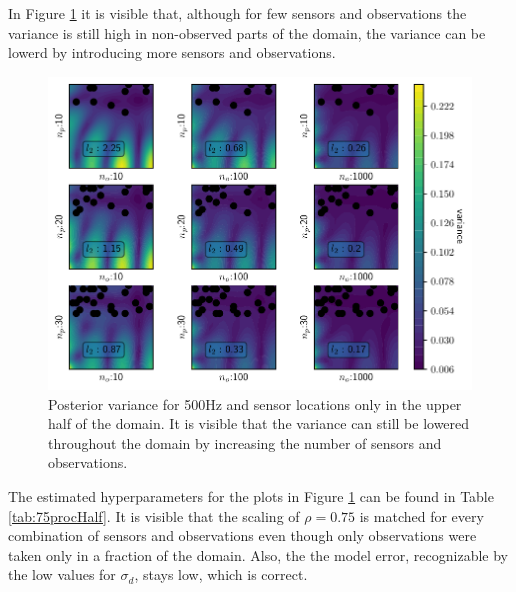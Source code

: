 \documentclass[%
  a4paper,oneside,%
  11pt,%
  smallchapters,
  style=printdev,
  extramargin,
  green,%
  rgb, <cmyk>
  ]{tubsbook}
\begin{document}
In Figure \ref{fig:VarianceHalfSided2D3t3} it is visible that, although for few sensors and observations the variance is still high in non-observed parts of the domain, the variance can be lowerd by introducing more sensors and observations.

\begin{figure}[!ht]
\includegraphics[width=1\textwidth]{../../Python/Results/2D/HalfSide/4/VarField_Posterior.pdf}
\centering
\caption{Posterior variance for 500Hz and sensor locations only in the upper half of the domain. It is visible that the variance can still be lowered throughout the domain by increasing the number of sensors and observations.}
\label{fig:VarianceHalfSided2D3t3}
\end{figure}

The estimated hyperparameters for the plots in Figure \ref{fig:VarianceHalfSided2D3t3} can be found in Table \ref{tab:75procHalf}. It is visible that the scaling of $\rho=0.75$ is matched for every combination of sensors and observations even though only observations were taken only in a fraction of the domain. Also, the the model error, recognizable by the low values for $\sigma_d$, stays low, which is correct.
\end{document}
